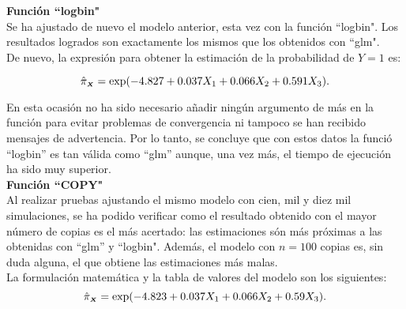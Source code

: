 \textbf{Función ``logbin"}\\
[0.3cm]
Se ha ajustado de nuevo el modelo anterior, esta vez con la función ``logbin". Los resultados logrados son exactamente los mismos que los obtenidos con ``glm".\\ 

De nuevo, la expresión para obtener la estimación de la probabilidad de $Y=1$ es:

\begin{equation*}
\hat{\pi}_{\mathsmaller{\boldsymbol{X}}}=\exp(-4.827+0.037X_1+0.066X_2+0.591X_3).
\end{equation*}

En esta ocasión no ha sido necesario añadir ningún argumento de más en la función para evitar problemas de convergencia ni tampoco se han recibido mensajes de advertencia. Por lo tanto, se concluye que con estos datos la funció ``logbin'' es tan válida como ``glm'' aunque, una vez más, el tiempo de ejecución ha sido muy superior.\\

\textbf{Función ``COPY"}\\
[0.3cm]
Al realizar pruebas ajustando el mismo modelo con cien, mil y diez mil simulaciones, se ha podido verificar como el resultado obtenido con el mayor número de copias es el más acertado: las estimaciones són más próximas a las obtenidas con ``glm'' y ``logbin". Además, el modelo con $n=100$ copias es, sin duda alguna, el que obtiene las estimaciones más malas.\\

La formulación matemática y la tabla de valores del modelo son los siguientes:
\begin{equation*} 
\hat{\pi}_{\mathsmaller{\boldsymbol{X}}}=\exp(-4.823+0.037X_1+0.066X_2+0.59X_3).
\end{equation*}

